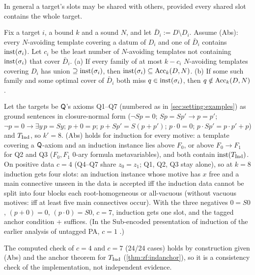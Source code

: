 In general a target's slots may be shared with others, provided every shared slot contains the whole target.

\begin{theorem}\label{thm:many:slots}
Fix a target $i$, a bound $k$ and a sound $N$, and let $\bar D_i:=D\setminus D_i$. Assume (Abs): every $N$-avoiding
template covering a datum of $D_i$ and one of $\bar D_i$ contains $\mathrm{inst}(\sigma_i)$. Let $c_i$ be the least number of
$N$-avoiding templates not containing $\mathrm{inst}(\sigma_i)$ that cover $\bar D_i$. (a) If every family of at most $k-c_i$
$N$-avoiding templates covering $D_i$ has union $\supseteq\mathrm{inst}(\sigma_i)$, then $\mathrm{inst}(\sigma_i)\subseteq\mathrm{Acc}_k(D,N)$.
(b) If some such family and some optimal cover of $\bar D_i$ both miss $q\in\mathrm{inst}(\sigma_i)$, then $q\notin\mathrm{Acc}_k(D,N)$.
\end{theorem}

\begin{corollary}\label{cor:many:paslots}
Let the targets be $\mathsf{Q}$'s axioms Q1--Q7 (numbered as in \cref{sec:setting:examples}) as ground sentences in
closure-normal form ($\neg Sp=0$; $Sp=Sp'\to p=p'$; $\neg p=0\to\exists y\,p=Sy$; $p+0=p$; $p+Sp'=S(p+p')$; $p\cdot0=0$;
$p\cdot Sp'=p\cdot p'+p$) and $T_{\mathrm{Ind}}$, so $k'=8$. (Abs) holds for induction for every motive: a template covering a
$\mathsf{Q}$-axiom and an induction instance lies above $F_0$, or above $F_0\to F_1$ for Q2 and Q3 ($F_0,F_1$ $0$-ary formula
metavariables), and both contain $\mathrm{inst}(T_{\mathrm{Ind}})$. On positive data $c=4$ (Q4--Q7 share $z_0=z_1$; Q1, Q2, Q3 stay
alone), so at $k=8$ induction gets four slots: an induction instance whose motive has $x$ free and a main
connective unseen in the data is accepted iff the induction data cannot be split into four blocks each root-homogeneous
or all-vacuous (without vacuous motives: iff at least five main connectives occur). With the three negatives $0=S0$, $(p+0)=0$, $(p\cdot0)=S0$,
$c=7$, induction gets one slot, and the tagged anchor condition \evR{}+\evN{} suffices. (In the Sub-encoded presentation
of induction of the earlier analysis of untagged PA, $c=1$ .)
\end{corollary}
The computed check of $c=4$ and $c=7$ (24/24 cases) holds by construction given (Abs) and the anchor theorem
for $T_{\mathrm{Ind}}$ (\cref{thm:zf:indanchor}), so it is a consistency check of the implementation, not independent evidence.

